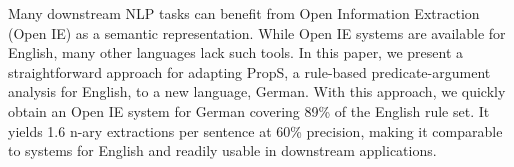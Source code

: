 Many downstream NLP tasks can benefit from Open Information Extraction (Open IE) as a semantic representation. While Open IE systems are available for English, many other languages lack such tools. In this paper, we present a straightforward approach for adapting PropS, a rule-based predicate-argument analysis for English, to a new language, German. With this approach, we quickly obtain an Open IE system for German covering 89\% of the English rule set. It yields 1.6 n-ary extractions per sentence at 60\% precision, making it comparable to systems for English and readily usable in downstream applications.
